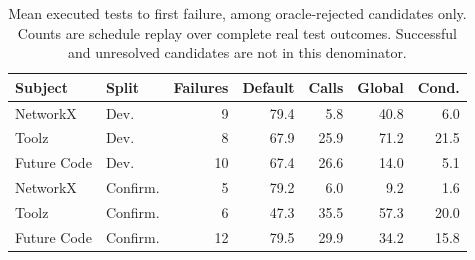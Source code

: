 \begin{table}[t]
\centering\small
\caption{Mean executed tests to first failure, among oracle-rejected candidates only. Counts are schedule replay over complete real test outcomes. Successful and unresolved candidates are not in this denominator.}\label{tab:checks}
\begin{tabular}{@{}llrrrrr@{}}
\toprule
Subject & Split & Failures & Default & Calls & Global & Cond.\\
\midrule
NetworkX & Dev. & 9 & 79.4 & 5.8 & 40.8 & 6.0\\
Toolz & Dev. & 8 & 67.9 & 25.9 & 71.2 & 21.5\\
Future Code & Dev. & 10 & 67.4 & 26.6 & 14.0 & 5.1\\
NetworkX & Confirm. & 5 & 79.2 & 6.0 & 9.2 & 1.6\\
Toolz & Confirm. & 6 & 47.3 & 35.5 & 57.3 & 20.0\\
Future Code & Confirm. & 12 & 79.5 & 29.9 & 34.2 & 15.8\\
\bottomrule
\end{tabular}
\end{table}
